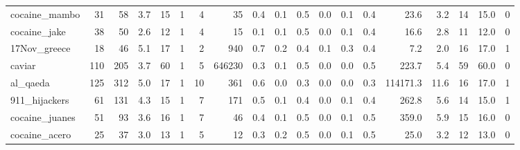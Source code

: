 \begin{tabular}{lrrrrrrrrrrrrrrrrrr}
cocaine\_mambo       &     31 &     58 &          3.7 &          15 &           1 &         4 &         35 &                 0.4 &            0.1 &           0.5 &           0.0 &      0.1 &             0.4 &            23.6 &                3.2 &            14 &          15.0 &             0 \\
cocaine\_jake        &     38 &     50 &          2.6 &          12 &           1 &         4 &         15 &                 0.1 &            0.1 &           0.5 &           0.0 &      0.1 &             0.4 &            16.6 &                2.8 &            11 &          12.0 &             0 \\
17Nov\_greece        &     18 &     46 &          5.1 &          17 &           1 &         2 &        940 &                 0.7 &            0.2 &           0.4 &           0.1 &      0.3 &             0.4 &             7.2 &                2.0 &            16 &          17.0 &             1 \\
caviar              &    110 &    205 &          3.7 &          60 &           1 &         5 &     646230 &                 0.3 &            0.1 &           0.5 &           0.0 &      0.0 &             0.5 &           223.7 &                5.4 &            59 &          60.0 &             0 \\
al\_qaeda            &    125 &    312 &          5.0 &          17 &           1 &        10 &        361 &                 0.6 &            0.0 &           0.3 &           0.0 &      0.0 &             0.3 &        114171.3 &               11.6 &            16 &          17.0 &             1 \\
911\_hijackers       &     61 &    131 &          4.3 &          15 &           1 &         7 &        171 &                 0.5 &            0.1 &           0.4 &           0.0 &      0.1 &             0.4 &           262.8 &                5.6 &            14 &          15.0 &             1 \\
cocaine\_juanes      &     51 &     93 &          3.6 &          16 &           1 &         7 &         46 &                 0.4 &            0.1 &           0.5 &           0.0 &      0.1 &             0.5 &           359.0 &                5.9 &            15 &          16.0 &             0 \\
cocaine\_acero       &     25 &     37 &          3.0 &          13 &           1 &         5 &         12 &                 0.3 &            0.2 &           0.5 &           0.0 &      0.1 &             0.5 &            25.0 &                3.2 &            12 &          13.0 &             0 \\

\end{tabular}

